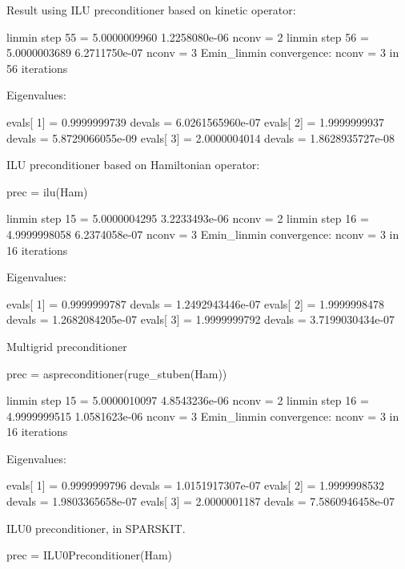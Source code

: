 Result using ILU preconditioner based on kinetic operator:
\begin{textcode}
linmin step       55 =       5.0000009960   1.2258080e-06  nconv =     2
linmin step       56 =       5.0000003689   6.2711750e-07  nconv =     3
Emin_linmin convergence: nconv =     3 in    56 iterations

Eigenvalues:

evals[  1] =       0.9999999739 devals =   6.0261565960e-07
evals[  2] =       1.9999999937 devals =   5.8729066055e-09
evals[  3] =       2.0000004014 devals =   1.8628935727e-08  
\end{textcode}

ILU preconditioner based on Hamiltonian operator:
\begin{juliacode}
prec = ilu(Ham)
\end{juliacode}

\begin{textcode}
linmin step       15 =       5.0000004295   3.2233493e-06  nconv =     2
linmin step       16 =       4.9999998058   6.2374058e-07  nconv =     3
Emin_linmin convergence: nconv =     3 in    16 iterations
  
Eigenvalues:
  
evals[  1] =       0.9999999787 devals =   1.2492943446e-07
evals[  2] =       1.9999998478 devals =   1.2682084205e-07
evals[  3] =       1.9999999792 devals =   3.7199030434e-07
\end{textcode}

Multigrid preconditioner
\begin{juliacode}
prec = aspreconditioner(ruge_stuben(Ham))
\end{juliacode}

\begin{textcode}
linmin step       15 =       5.0000010097   4.8543236e-06  nconv =     2
linmin step       16 =       4.9999999515   1.0581623e-06  nconv =     3
Emin_linmin convergence: nconv =     3 in    16 iterations

Eigenvalues:

evals[  1] =       0.9999999796 devals =   1.0151917307e-07
evals[  2] =       1.9999998532 devals =   1.9803365658e-07
evals[  3] =       2.0000001187 devals =   7.5860946458e-07
\end{textcode}


ILU0 preconditioner, in SPARSKIT.
\begin{juliacode}
prec = ILU0Preconditioner(Ham)
\end{juliacode}

